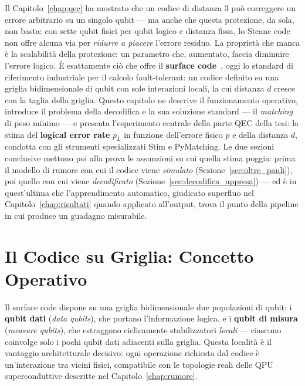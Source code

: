 \begin{onehalfspace}

Il Capitolo~\ref{chap:qec} ha mostrato che un codice di distanza 3 può correggere un errore arbitrario su un singolo qubit --- ma anche che questa protezione, da sola, non basta: con sette qubit fisici per qubit logico e distanza fissa, lo Steane code non offre alcuna via per \emph{ridurre a piacere} l'errore residuo. La proprietà che manca è la scalabilità della protezione: un parametro che, aumentato, faccia diminuire l'errore logico. È esattamente ciò che offre il \textbf{surface code}~\cite{kitaev2003,fowler2012}, oggi lo standard di riferimento industriale per il calcolo fault-tolerant: un codice definito su una griglia bidimensionale di qubit con sole interazioni locali, la cui distanza $d$ cresce con la taglia della griglia. Questo capitolo ne descrive il funzionamento operativo, introduce il problema della decodifica e la sua soluzione standard --- il \textit{matching} di peso minimo --- e presenta l'esperimento centrale della parte QEC della tesi: la stima del \textbf{logical error rate} $p_L$ in funzione dell'errore fisico $p$ e della distanza $d$, condotta con gli strumenti specializzati Stim e PyMatching. Le due sezioni conclusive mettono poi alla prova le assunzioni su cui quella stima poggia: prima il modello di rumore con cui il codice viene \emph{simulato} (Sezione~\ref{sec:oltre_pauli}), poi quello con cui viene \emph{decodificato} (Sezione~\ref{sec:decodifica_appresa}) --- ed è in quest'ultima che l'apprendimento automatico, giudicato superfluo nel Capitolo~\ref{chap:risultati} quando applicato all'output, trova il punto della pipeline in cui produce un guadagno misurabile.

\section{Il Codice su Griglia: Concetto Operativo}
\label{sec:surface_concetto}

Il surface code dispone su una griglia bidimensionale due popolazioni di qubit: i \textbf{qubit dati} (\textit{data qubits}), che portano l'informazione logica, e i \textbf{qubit di misura} (\textit{measure qubits}), che estraggono ciclicamente stabilizzatori \emph{locali} --- ciascuno coinvolge solo i pochi qubit dati adiacenti sulla griglia. Questa località è il vantaggio architetturale decisivo: ogni operazione richiesta dal codice è un'interazione tra vicini fisici, compatibile con le topologie reali delle QPU superconduttive descritte nel Capitolo~\ref{chap:rumore}.


\end{onehalfspace}
